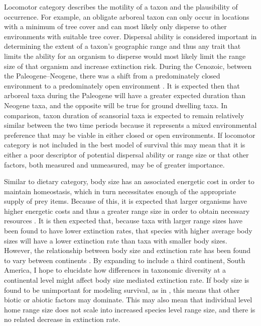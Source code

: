 \documentclass[12pt,letterpaper]{article}
\begin{document}
Locomotor category describes the motility of a taxon and the plausibility of occurrence. For example, an obligate arboreal taxon can only occur in locations with a minimum of tree cover and can most likely only disperse to other environments with suitable tree cover. Dispersal ability is considered important in determining the extent of a taxon's geographic range \citep{Birand2012,Jablonski2006a,Gaston2009} and thus any trait that limits the ability for an organism to disperse would most likely limit the range size of that organism and increase extinction risk. During the Cenozoic, between the Paleogene--Neogene, there was a shift from a predominately closed environment to a predominately open environment \citep{Janis1993a,Blois2009,Rose2006}. It is expected then that arboreal taxa during the Paleogene will have a greater expected duration than Neogene taxa, and the opposite will be true for ground dwelling taxa. In comparison, taxon duration of scansorial taxa is expected to remain relatively similar between the two time periods because it represents a mixed environmental preference that may be viable in either closed or open environments. If locomotor category is not included in the best model of survival this may mean that it is either a poor descriptor of potential dispersal ability or range size or that other factors, both measured and unmeasured, may be of greater importance.

Similar to dietary category, body size has an associated energetic cost in order to maintain homeostasis, which in turn necessitates enough of the appropriate supply of prey items. Because of this, it is expected that larger organisms have higher energetic costs and thus a greater range size in order to obtain necessary resources \citep{Damuth1979,Brown1987,Damuth1979,Lyons2010}. It is then expected that, because taxa with larger range sizes have been found to have lower extinction rates, that species with higher average body sizes will have a lower extinction rate than taxa with smaller body sizes. However, the relationship between body size and extinction rate has been found to vary between continents \citep{Tomiya2013,Liow2008}. By expanding to include a third continent, South America, I hope to elucidate how differences in taxonomic diversity at a continental level might affect body size mediated extinction rate. If body size is found to be unimportant for modeling survival, as in \citet{Tomiya2013}, this means that other biotic or abiotic factors may dominate. This may also mean that individual level home range size does not scale into increased species level range size, and there is no related decrease in extinction rate. 
\end{document}
